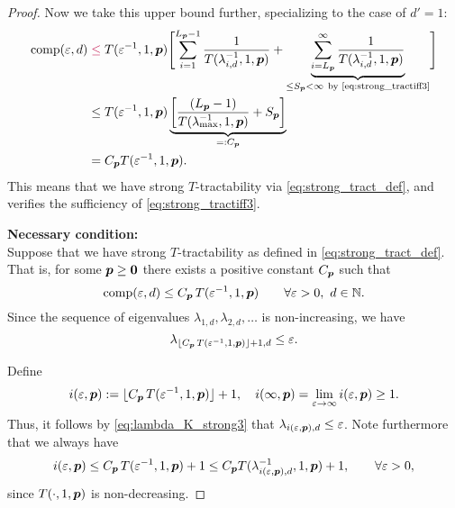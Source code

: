 \documentclass[11pt,a4paper]{article}
\newcommand{\peter}[1]{\begingroup\color{purple}#1\endgroup}
\begin{document}
\begin{proof}
Now we take this upper bound further, specializing to the case of $d'=1$:
\begin{align*}
       \comp(\varepsilon,d)
       & \peter{\le} T(\varepsilon^{-1},1, \vp) \Biggl [ \sum_{i=1}^{L_{\vp}-1} \frac{1}{T(\lambda_{i, d}^{-1},1,\vp)}
       + \underbrace{\sum_{i=L_{\vp}}^\infty \frac{1}{T(\lambda_{i, d}^{-1},1,\vp)}}_{\le S_{\vp} <\infty\ \text{by \eqref{eq:strong_tractiff3}} }\Biggr] \\
       & \le T(\varepsilon^{-1},1,\vp) \underbrace{\left[\frac{(L_{\vp}-1)}{T(\lambda_{\max}^{-1},1,\vp)} + S_{\vp}\right]}_{=:C_{\vp}}\\
       & =  C_{\vp}T(\varepsilon^{-1},1,\vp).
\end{align*}
This means that we have strong $T$-tractability via \eqref{eq:strong_tract_def}, and verifies the sufficiency of \eqref{eq:strong_tractiff3}.



\bigskip
\noindent \textbf{Necessary condition:} \\
Suppose that we have strong
$T$-tractability as defined in \eqref{eq:strong_tract_def}. That is, for some $\boldsymbol{p} \ge \boldsymbol{0}$ there exists a positive constant $C_{\boldsymbol{p}}$ such that
\[
\operatorname{comp}(\varepsilon,d)\le C_{\boldsymbol{p}}\, T(\varepsilon^{-1},1,\boldsymbol{p})
\qquad \forall \varepsilon > 0, \ d \in \mathbb{N}.
\]
Since the sequence of eigenvalues $\lambda_{1,d}, \lambda_{2,d}, \ldots $ is non-increasing, we have
\begin{equation}\label{eq:lambda_K_strong3}
\lambda_{\lfloor C_{\boldsymbol{p}}\, T(\varepsilon^{-1},1,\boldsymbol{p})\rfloor +1,d}\le \varepsilon.
\end{equation}

Define
\[
i(\varepsilon,\boldsymbol{p}):= \lfloor C_{\boldsymbol{p}}\, T(\varepsilon^{-1},1,\boldsymbol{p})\rfloor +1, \quad
i(\infty,\boldsymbol{p}) = \lim_{\varepsilon \to \infty}  i(\varepsilon,\boldsymbol{p}) \ge 1 .
\]
Thus, it follows by \eqref{eq:lambda_K_strong3} that $\lambda_{i(\varepsilon,\boldsymbol{p}),d} \le \varepsilon$.
Note furthermore that we always have
\[
i(\varepsilon,\boldsymbol{p})\le C_{\boldsymbol{p}}\, T(\varepsilon^{-1},1,\boldsymbol{p})+1 \le C_{\boldsymbol{p}} T(\lambda_{i(\varepsilon,\boldsymbol{p}),d}^{-1},1,\boldsymbol{p})+1, \qquad \forall \varepsilon > 0,
\]
since
$T(\cdot,1, \boldsymbol{p})$ is non-decreasing.


\end{proof}
\end{document}
